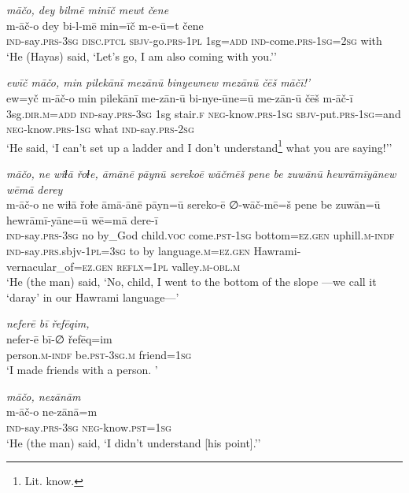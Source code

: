 \ea \label{ŽH.11}
\textit{māčo, dey bilmē minīč mewt čene} \\ 
\gll m-āč-o dey bi-l-mē min=īč m-e-ū=t čene \\ 
 \textsc{ind-}say\textsc{.prs}\textsc{-3sg} \textsc{disc.ptcl} \textsc{sbjv-}go\textsc{.prs}\textsc{-1pl} 1sg\textsc{=add} \textsc{ind-}come\textsc{.prs}\textsc{-1sg}\textsc{=\textsc{2sg}} with \\ 
\glt `He (Hayas) said, ‘Let’s go, I am also coming with you.’'
\z 
 
\ea \label{ŽH.13}
\textit{ewīč māčo, min pilekānī mezānū binyewnew mezānū čēš māčī!’} \\ 
\gll ew=yč m-āč-o min pilekānī me-zān-ū bi-nye-ūne=ū me-zān-ū čēš m-āč-ī \\ 
 3sg\textsc{.dir}\textsc{.m}\textsc{=add} \textsc{ind-}say\textsc{.prs}\textsc{-3sg} 1sg stair\textsc{\textsc{.f}} \textsc{neg-}know\textsc{.prs}\textsc{-1sg} \textsc{sbjv-}put\textsc{.prs}\textsc{-1sg}=and \textsc{neg-}know\textsc{.prs}\textsc{-1sg} what \textsc{ind-}say\textsc{.prs}-\textsc{2sg} \\ 
\glt `He said, ‘I can’t set up a ladder and I don’t understand\footnote{Lit. know.}  what you are saying!’'
\z 
 
\ea \label{ŽH.23}
\textit{māčo, ne wiɫā řoɫe, āmānē pāynū serekoē wāčmēš pene be zuwānū hewrāmīyānew wēmā derey} \\ 
\gll m-āč-o ne wiɫā řoɫe āmā-ānē pāyn=ū sereko-ē ∅-wāč-mē=š pene be zuwān=ū hewrāmī-yāne=ū wē=mā dere-ī \\ 
 \textsc{ind-}say\textsc{.prs}\textsc{-3sg} no by\_God child.\textsc{voc} come\textsc{.pst}\textsc{-1sg} bottom\textsc{=ez}\textsc{.gen} uphill\textsc{.m}\textsc{-indf} \textsc{ind-}say\textsc{.prs}.sbjv\textsc{-1pl}\textsc{=3sg} to by language\textsc{.m}\textsc{=ez}\textsc{.gen} Hawrami-vernacular\_of\textsc{=ez}\textsc{.gen} \textsc{reflx}\textsc{=1pl} valley\textsc{.m}\textsc{-obl}\textsc{.m} \\ 
\glt `He (the man) said, ‘No, child, I went to the bottom of the slope —we call it ‘daray’ in our Hawrami language—'
\z 
 
\ea \label{ŽH.24}
\textit{neferē bī řefēqim,} \\ 
\gll nefer-ē bī-∅ řefēq=im \\ 
 person\textsc{.m}\textsc{-indf} be\textsc{.pst}\textsc{-3sg}\textsc{.m} friend\textsc{=1sg} \\ 
\glt `I made friends with a person. '
\z 
 
\ea \label{ŽH.26}
\textit{māčo, nezānām} \\ 
\gll m-āč-o ne-zānā=m \\ 
 \textsc{ind-}say\textsc{.prs}\textsc{-3sg} \textsc{neg-}know\textsc{.pst}\textsc{=1sg} \\ 
\glt `He (the man) said, ‘I didn’t understand [his point].’'
\z 
 
